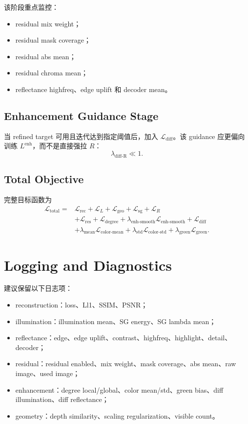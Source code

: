 \documentclass[11pt]{article}
\begin{document}
该阶段重点监控：
\begin{itemize}[leftmargin=1.5em]
    \item residual mix weight；
    \item residual mask coverage；
    \item residual abs mean；
    \item residual chroma mean；
    \item reflectance highfreq、edge uplift 和 decoder mean。
\end{itemize}

\subsection{Enhancement Guidance Stage}

当 refined target 可用且迭代达到指定阈值后，加入 $\mathcal{L}_{\text{diff}}$。该 guidance 应更偏向训练 $L^{\text{enh}}$，而不是直接强拉 $R$：
\begin{equation}
    \lambda_{\text{diff-R}} \ll 1.
\end{equation}

\subsection{Total Objective}

完整目标函数为
\begin{align}
    \mathcal{L}_{\text{total}}
    ={}&
    \mathcal{L}_{\text{rec}}
    +
    \mathcal{L}_{L}
    +
    \mathcal{L}_{\text{geo}}
    +
    \mathcal{L}_{\text{sg}}
    +
    \mathcal{L}_{R}
    \nonumber \\
    &+
    \mathcal{L}_{\text{res}}
    +
    \mathcal{L}_{\text{degree}}
    +
    \lambda_{\text{enh-smooth}}
    \mathcal{L}_{\text{enh-smooth}}
    +
    \mathcal{L}_{\text{diff}}
    \nonumber \\
    &+
    \lambda_{\text{mean}}
    \mathcal{L}_{\text{color-mean}}
    +
    \lambda_{\text{std}}
    \mathcal{L}_{\text{color-std}}
    +
    \lambda_{\text{green}}
    \mathcal{L}_{\text{green}}.
\end{align}

\section{Logging and Diagnostics}

建议保留以下日志项：
\begin{itemize}[leftmargin=1.5em]
    \item reconstruction：loss、Ll1、SSIM、PSNR；
    \item illumination：illumination mean、SG energy、SG lambda mean；
    \item reflectance：edge、edge uplift、contrast、highfreq、highlight、detail、decoder；
    \item residual：residual enabled、mix weight、mask coverage、abs mean、raw image、used image；
    \item enhancement：degree local/global、color mean/std、green bias、diff illumination、diff reflectance；
    \item geometry：depth similarity、scaling regularization、visible count。
\end{itemize}
\end{document}
